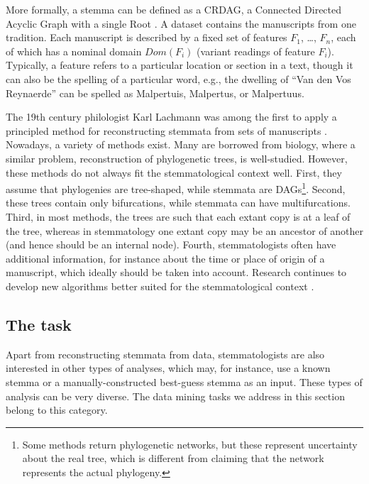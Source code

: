 \documentclass{tlp}
\renewcommand{\|}{\ensuremath{\,|\,}}
\renewcommand{\|}{\,|\,}
\begin{document}
More formally, a stemma can be defined as a CRDAG, a Connected
Directed Acyclic Graph with a single Root \cite{Andrews-IP}.  A
dataset contains the manuscripts from one tradition. Each manuscript
is described by a fixed set of features $F_1$, \ldots, $F_n$, each of
which has a nominal domain $Dom(F_i)$ (variant readings of feature
$F_i$). Typically, a feature refers to a particular location or
section in a text, though it can also be the spelling of a particular
word, e.g., the dwelling of ``Van den Vos Reynaerde'' can be spelled
as Malpertuis, Malpertus, or Malpertuus.

The 19th century philologist Karl Lachmann was among the first to
apply a principled method for reconstructing stemmata from sets of
manuscripts \cite{Timpanaro:book}.  Nowadays, a variety of methods
exist.  Many are borrowed from biology, where a similar problem,
reconstruction of phylogenetic trees, is well-studied.  However, these
methods do not always fit the stemmatological context well.  First,
they assume that phylogenies are tree-shaped, while stemmata are
DAGs\footnote{Some methods return phylogenetic networks, but these
  represent uncertainty about the real tree, which is different from
  claiming that the network represents the actual phylogeny.}.  Second,
these trees contain only bifurcations, while stemmata can have
multifurcations.  Third, in most methods,
the trees are such that each extant copy is at a leaf of the tree,
whereas in stemmatology one extant copy may be an ancestor of another
(and hence should be an internal node).  Fourth, stemmatologists often
have additional information, for instance about the time or place of
origin of a manuscript, which ideally should be taken into account.
Research continues to develop new algorithms better suited for the
stemmatological context \cite{Baret06}.



\subsection{The task}


Apart from reconstructing stemmata from data, stemmatologists are also
interested in other types of analyses, which may, for instance, use a
known stemma or a manually-constructed best-guess stemma as an input.
These types of analysis can be very diverse.  The data mining tasks we
address in this section belong to this category.
\end{document}
